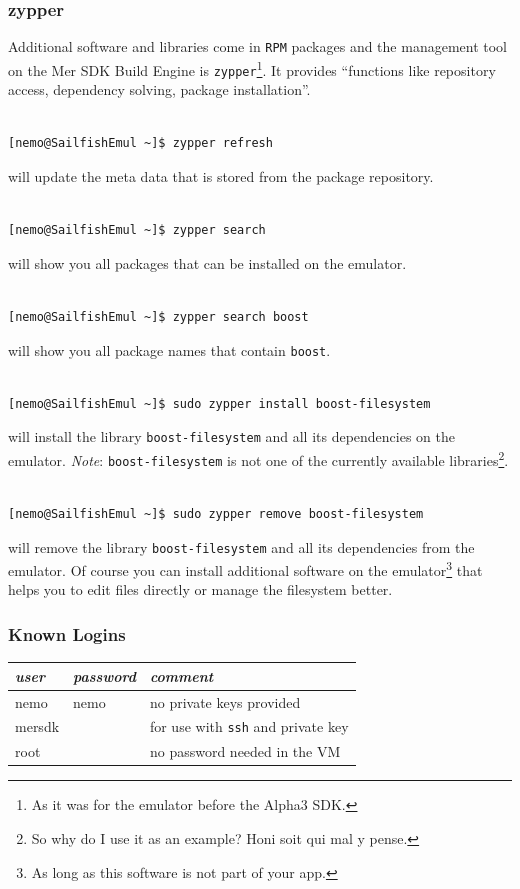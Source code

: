 \subsubsection{zypper}\label{subsubsec:zypper}
%
Additional software and libraries come in \verb,RPM, packages and the management tool on the Mer SDK Build Engine is \verb,zypper,\footnote{As it was for the emulator before the Alpha3 SDK.}. It provides ``functions like repository access, dependency solving, package installation''\cite{suse01}.\\
\\
%
\begin{lstlisting}[language=bash]
[nemo@SailfishEmul ~]$ zypper refresh
\end{lstlisting}
will update the meta data that is stored from the package repository.
%
\\
\\
%
\begin{lstlisting}[language=bash]
[nemo@SailfishEmul ~]$ zypper search
\end{lstlisting}
will show you all packages that can be installed on the emulator.
%
\\
\\
\begin{lstlisting}[language=bash]
[nemo@SailfishEmul ~]$ zypper search boost
\end{lstlisting}
will show you all package names that contain \verb,boost,.
%
\\
\\
\begin{lstlisting}[language=bash]
[nemo@SailfishEmul ~]$ sudo zypper install boost-filesystem
\end{lstlisting}
will install the library \verb,boost-filesystem, and all its dependencies on the emulator. \emph{Note}: \verb,boost-filesystem, is not one of the currently available libraries\footnote{So why do I use it as an example? Honi soit qui mal y pense.}.
%
\\
\\
\begin{lstlisting}[language=bash]
[nemo@SailfishEmul ~]$ sudo zypper remove boost-filesystem
\end{lstlisting}
will remove the library \verb,boost-filesystem, and all its dependencies from the emulator.
Of course you can install additional software on the emulator\footnote{As long as this software is not part of your app.} that helps you to edit files directly or manage the filesystem better. 
%
\subsubsection{Known Logins}\label{subsubsec:mersdklogins}
%
\begin{tabular}{lll}
  \emph{user} & \emph{password} & \emph{comment} \\
  \hline 
  nemo & nemo & no private keys provided \\
  mersdk &  & for use with \verb,ssh, and private key \\
  root &  & no password needed in the VM \\
\end{tabular}
%
%
